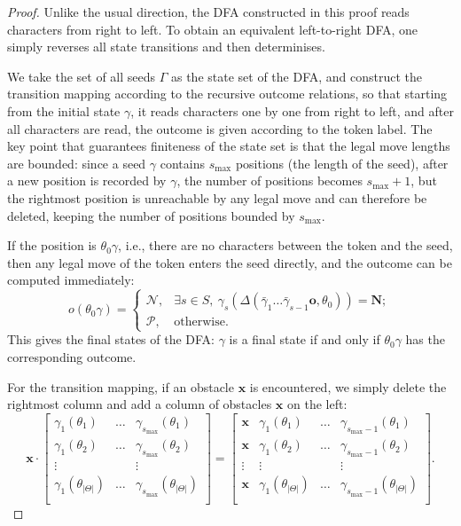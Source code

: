 \documentclass[10pt,a4paper]{amsart}
\newcommand{\e}{\mathbf{o}}
\newcommand{\rmN}{\mathbf{N}}
\newcommand{\varN}{\mathcal{N}}
\newcommand{\varP}{\mathcal{P}}
\newcommand{\x}{\mathbf{x}}
\begin{document}
\begin{proof}
    Unlike the usual direction, the DFA constructed in this proof reads characters from right to left.
    To obtain an equivalent left-to-right DFA, one simply reverses all state transitions and then determinises.

    We take the set of all seeds $\varGamma$ as the state set of the DFA, and construct the transition mapping according to the recursive outcome relations,
    so that starting from the initial state $\gamma$, it reads characters one by one from right to left, and after all characters are read, the outcome is given according to the token label.
    The key point that guarantees finiteness of the state set is that the legal move lengths are bounded:
    since a seed $\gamma$ contains $s_{\max}$ positions (the length of the seed), after a new position is recorded by $\gamma$, the number of positions becomes $s_{\max}+1$, but the rightmost position is unreachable by any legal move and can therefore be deleted, keeping the number of positions bounded by $s_{\max}$.

    If the position is $\theta_0\gamma$, i.e., there are no characters between the token and the seed, then any legal move of the token enters the seed directly, and the outcome can be computed immediately:
    \[
        o(\theta_0\gamma) =
        \begin{cases}
            \varN, & \exists s\in S,\ \gamma_s(\varDelta(\bar{\gamma}_{1}\ldots\bar{\gamma}_{s-1}\e ,\theta_0)) = \rmN; \\
            \varP, & \text{otherwise}.
        \end{cases}
    \]
    This gives the final states of the DFA: $\gamma$ is a final state if and only if $\theta_0\gamma$ has the corresponding outcome.

    For the transition mapping, if an obstacle $\x$ is encountered, we simply delete the rightmost column and add a column of obstacles $\x$ on the left:
    \[
        \x\cdot
        \begin{bmatrix}
            \gamma_1(\theta_1) & \ldots & \gamma_{s_{\max}}(\theta_1) \\
            \gamma_1(\theta_2) & \ldots & \gamma_{s_{\max}}(\theta_2) \\
            \vdots & & \vdots \\
            \gamma_1(\theta_{|\varTheta|}) & \ldots & \gamma_{s_{\max}}(\theta_{|\varTheta|}) \\
        \end{bmatrix}
        =
        \begin{bmatrix}
            \x & \gamma_1(\theta_1) & \ldots & \gamma_{s_{\max}-1}(\theta_1) \\
            \x & \gamma_1(\theta_2) & \ldots & \gamma_{s_{\max}-1}(\theta_2) \\
            \vdots & \vdots & & \vdots \\
            \x & \gamma_1(\theta_{|\varTheta|}) & \ldots & \gamma_{s_{\max}-1}(\theta_{|\varTheta|}) \\
        \end{bmatrix}.
    \]


\end{proof}
\end{document}

